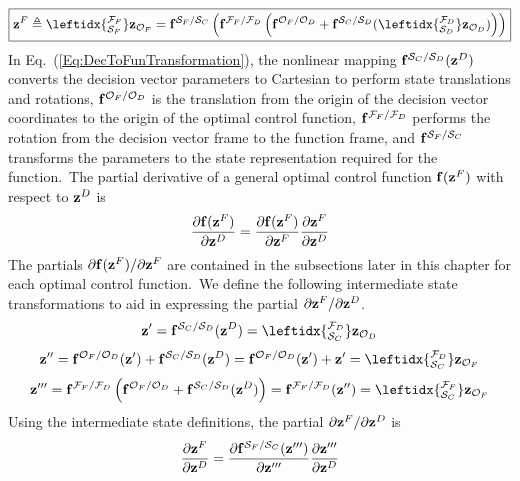 %
\begin{equation}
\boxed{
 \mbz^{F} \triangleq  \leftidx{_{\mcS_F}^{\mcF_F}} \mbz_{\mcO_F} = \mbf^{\mcS_F / \mcS_C}\left(\mbf^{\mcF_F / \mcF_D} \left(\mbf^{\mcO_F / \mcO_D}  + \mbf^{\mcS_C / \mcS_D} ( \leftidx{_{\mcS_D}^{\mcF_D}} \mbz_{\mcO_D})  \right)  \right)} \label{Eq:DecToFunTransformation}
\end{equation}
%
In Eq.~(\ref{Eq:DecToFunTransformation}), the nonlinear mapping $\mathbf{f}^{\mathcal{S}_C / \mathcal{S}_D} (\mathbf{z}^D)$ converts the decision vector parameters to Cartesian to perform state translations and rotations, $\mathbf{f}^{\mathcal{O}_F / \mathcal{O}_D}$ is the translation from the origin of the decision vector coordinates to the origin of the optimal control function, $\mathbf{f}^{\mathcal{F}_F / \mathcal{F}_D}$ performs the rotation from the decision vector frame to the function frame, and $\mathbf{f}^{\mathcal{S}_F / \mathcal{S}_C}$ transforms the parameters to the state representation required for the function.~The partial derivative of a general optimal control function  $\mathbf{f}(\mathbf{z}^{F})$ with respect to $\mathbf{z}^{D}$ is
%
\begin{equation}
\frac{\partial \mathbf{f}(\mathbf{z}^{F})}{\partial\mathbf{z}^{D}} =
\frac{\partial \mathbf{f}(\mathbf{z}^{F})}{\partial\mathbf{z}^{F}}\frac{\partial \mathbf{z}^{F}}{\partial\mathbf{z}^{D}}
\end{equation}
%
The partials $\partial \mathbf{f}(\mathbf{z}^{F})/\partial\mathbf{z}^{F}$ are contained in the subsections later in this chapter for each optimal control function.~We define the following intermediate state transformations to aid in expressing the partial $\partial \mathbf{z}^{F}/\partial\mathbf{z}^{D}$.
%
\begin{equation}
   \mbz' = \mbf^{\mcS_C / \mcS_D} (\mbz^D) = \leftidx{_{\mcS_C}^{\mcF_D}} \mbz_{\mcO_D}
\end{equation}
%
\begin{equation}
   \mbz'' = \mbf^{\mcO_F / \mcO_D}  (\mbz')+ \mbf^{\mcS_C / \mcS_D} (\mbz^D) = \mbf^{\mcO_F / \mcO_D}( \mbz') + \mbz' = \leftidx{_{\mcS_C}^{\mcF_D}} \mbz_{\mcO_F}
\end{equation}
%
\begin{equation}
   \mbz''' = \mbf^{\mcF_F / \mcF_D} \left(\mbf^{\mcO_F / \mcO_D}  + \mbf^{\mcS_C / \mcS_D} (\mbz^D)\right)  =  \mbf^{\mcF_F / \mcF_D}(\mbz'') = \leftidx{_{\mcS_C}^{\mcF_F}} \mbz_{\mcO_F}
\end{equation}
%
Using the intermediate state definitions, the partial $\partial \mathbf{z}^{F}/\partial\mathbf{z}^{D}$ is
%
\begin{equation}
   \frac{\partial \mathbf{z}^{F}}{\partial\mathbf{z}^{D}} = \frac{\partial \mathbf{f}^{\mathcal{S}_F / \mathcal{S}_C}(\mathbf{z}''')}{\partial\mathbf{z}'''}\frac{\partial \mathbf{z}'''}{\partial \mathbf{z}^D}  \label{Eq:FuncJac_wrtz3}
\end{equation}
